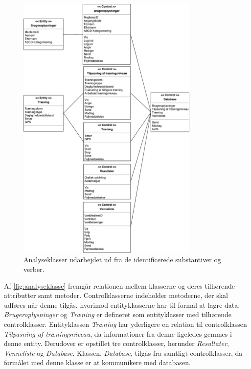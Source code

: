 \begin{figure}[H]
\centering
\includegraphics[width=0.8\textwidth]{figures/aktivitetsdiagram/analyseklasser}
\caption{Analyseklasser udarbejdet ud fra de identificerede substantiver og verber.}
\label{fig:analyseklasse}
\end{figure}

\noindent
Af \autoref{fig:analyseklasse} fremgår relationen mellem klasserne og deres tilhørende attributter samt metoder. Controlklasserne indeholder metoderne, der skal udføres når denne tilgås, hvorimod entityklasserne har til formål at lagre data. \textit{Brugeroplysninger} og \textit{Træning} er defineret som entityklasser med tilhørende controlklasser. Entityklassen \textit{Træning} har yderligere en relation til controlklassen \textit{Tilpasning af træningsniveau}, da informationer fra denne ligeledes gemmes i denne entity. Derudover er opstillet tre controlklasser, herunder \textit{Resultater}, \textit{Venneliste} og \textit{Database}. Klassen, \textit{Database}, tilgås fra samtligt controlklasser, da formålet med denne klasse er at kommunikere med databasen. 